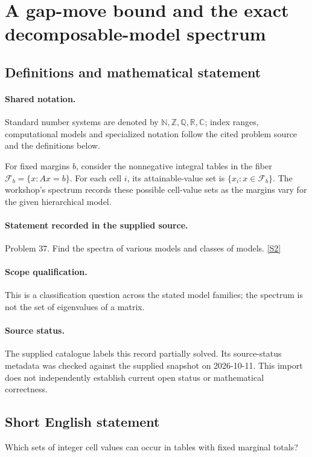 \documentclass[11pt]{article}
\newcommand{\sref}[2]{\hyperlink{source:#1:#2}{[S#2]}}
\begin{document}
\section{A gap-move bound and the exact decomposable-model spectrum}\label{statement}

\subsection{Definitions and mathematical statement}

\paragraph{Shared notation.}Standard number systems are denoted by $\mathbb N,\mathbb Z,\mathbb Q,\mathbb R,\mathbb C$; index ranges, computational models and specialized notation follow the cited problem source and the definitions below.


For fixed margins $b$, consider the nonnegative integral tables in the fiber $\mathcal F_b=\{x:Ax=b\}$. For each cell $i$, its attainable-value set is $\{x_i:x\in\mathcal F_b\}$. The workshop's spectrum records these possible cell-value sets as the margins vary for the given hierarchical model.
\paragraph{Statement recorded in the supplied source.}
Problem 37. Find the spectra of various models and classes of models. \sref{statement}{2}
\paragraph{Scope qualification.}
This is a classification question across the stated model families; the spectrum is not the set of eigenvalues of a matrix.
\paragraph{Source status.}
The supplied catalogue labels this record partially solved. Its source-status metadata was checked against the supplied snapshot on 2026-10-11. This import does not independently establish current open status or mathematical correctness.
\subsection{Short English statement}
Which sets of integer cell values can occur in tables with fixed marginal totals?
\end{document}

